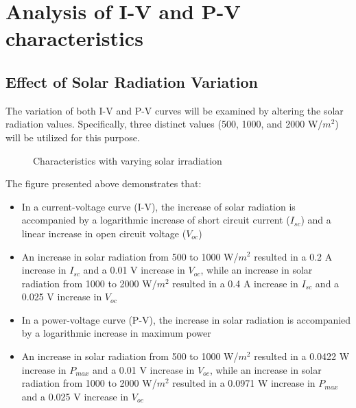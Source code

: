 \documentclass{report}
\begin{document}
\section{Analysis of I-V and P-V characteristics}
\subsection{Effect of Solar Radiation Variation}

The variation of both I-V and P-V curves will be examined by altering the solar radiation values. Specifically, three distinct values (500, 1000, and 2000 W/$m^2$) will be utilized for this purpose.\\

\begin{figure}[h!]
  \centering
  \hfill
  \caption{Characteristics with varying solar irradiation}
\end{figure}

The figure presented above demonstrates that:
\begin{itemize}
    \item In a current-voltage curve (I-V), the increase of solar radiation is accompanied by a logarithmic increase of short circuit current  ($I_{sc}$) and a linear increase in open circuit voltage ($V_{oc}$) \newpage
    \item  An increase in solar radiation from 500 to 1000 W/$m^2$ resulted in a 0.2 A increase in $I_{sc}$ and a 0.01 V increase in $V_{oc}$, while an increase in solar radiation from 1000 to 2000 W/$m^2$ resulted in a 0.4 A increase in $I_{sc}$ and a 0.025 V increase in $V_{oc}$
    \item In a power-voltage curve (P-V), the increase in solar radiation is accompanied by a logarithmic increase in maximum power
    \item  An increase in solar radiation from 500 to 1000 W/$m^2$ resulted in a 0.0422 W increase in $P_{max}$ and a 0.01 V increase in $V_{oc}$, while an increase in solar radiation from 1000 to 2000 W/$m^2$ resulted in a 0.0971 W increase in $P_{max}$ and a 0.025 V increase in $V_{oc}$
\end{itemize}
\end{document}
